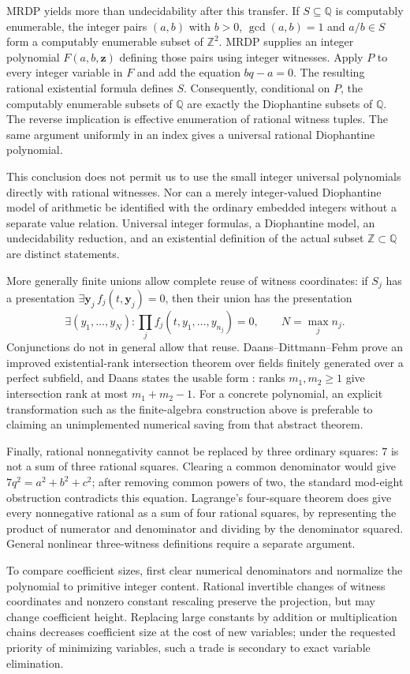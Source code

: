 MRDP yields more than undecidability after this transfer. If
$S\subseteq\mathbb Q$ is computably enumerable, the integer pairs
$(a,b)$ with $b>0$, $\gcd(a,b)=1$ and $a/b\in S$ form a computably
enumerable subset of $\mathbb Z^2$. MRDP supplies an integer polynomial
$F(a,b,\mathbf z)$ defining those pairs using integer witnesses.
Apply $P$ to every integer variable in $F$ and add the equation $bq-a=0$.
The resulting rational existential formula defines $S$.
Consequently, conditional on $P$, the computably enumerable subsets of
$\mathbb Q$ are exactly the Diophantine subsets of $\mathbb Q$.
The reverse implication is effective enumeration of rational witness tuples.
The same argument uniformly in an index gives a universal rational
Diophantine polynomial.

This conclusion does not permit us to use the small integer universal
polynomials directly with rational witnesses. Nor can a merely
integer-valued Diophantine model of arithmetic be identified with the
ordinary embedded integers without a separate value relation. Universal
integer formulas, a Diophantine model, an undecidability reduction, and
an existential definition of the actual subset $\mathbb Z\subset\mathbb Q$
are distinct statements.

More generally finite unions allow complete reuse of witness coordinates:
if $S_j$ has a presentation $\exists\mathbf y_j\,f_j(t,\mathbf y_j)=0$,
then their union has the presentation
\[
 \exists(y_1,\ldots,y_N):
 \prod_j f_j(t,y_1,\ldots,y_{n_j})=0,
 \qquad N=\max_j n_j.
\]
Conjunctions do not in general allow that reuse. Daans--Dittmann--Fehm
prove an improved existential-rank intersection theorem over fields finitely
generated over a perfect subfield, and Daans states the usable form
\cite[Theorem 2.5]{Daans2024}: ranks $m_1,m_2\ge1$ give intersection
rank at most $m_1+m_2-1$. For a concrete polynomial, an explicit
transformation such as the finite-algebra construction above is preferable
to claiming an unimplemented numerical saving from that abstract theorem.

Finally, rational nonnegativity cannot be replaced by three ordinary
squares: $7$ is not a sum of three rational squares. Clearing a common
denominator would give $7q^2=a^2+b^2+c^2$; after removing common powers
of two, the standard mod-eight obstruction contradicts this equation.
Lagrange's four-square theorem does give every nonnegative rational as a
sum of four rational squares, by representing the product of numerator
and denominator and dividing by the denominator squared. General nonlinear
three-witness definitions require a separate argument.

To compare coefficient sizes, first clear numerical denominators and
normalize the polynomial to primitive integer content. Rational invertible
changes of witness coordinates and nonzero constant rescaling preserve the
projection, but may change coefficient height. Replacing large constants
by addition or multiplication chains decreases coefficient size at the cost
of new variables; under the requested priority of minimizing variables,
such a trade is secondary to exact variable elimination.
